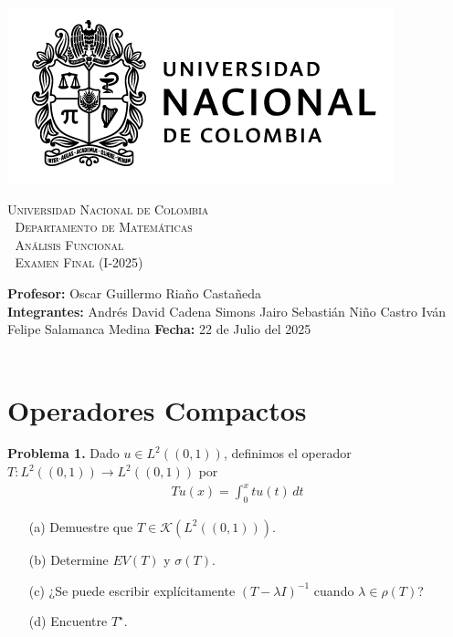 \thispagestyle{empty}

\begin{minipage}{0.3\textwidth}
  \includegraphics[scale=0.35]{logounal.png}
\end{minipage}%
\hfill
\begin{minipage}{0.65\textwidth}
  \begin{center}
    \scshape
    \Large \textsc{Universidad Nacional de Colombia} \\
    \textcolor{white}{\tiny.} \Large \textsc{Departamento de Matemáticas} \\
    \textcolor{white}{\tiny.} \large \textsc{Análisis Funcional} \\
    \textcolor{white}{\tiny.} \large \textsf{Examen Final} \normalsize (I-2025)
  \end{center}
\end{minipage}

\vspace{0.3cm}
\normalfont

\textbf{Profesor:} Oscar Guillermo Riaño Castañeda\\
\textbf{Integrantes:} Andrés David Cadena Simons \hspace{2.8cm}  Jairo Sebastián Niño Castro\hspace{2.8cm}
Iván Felipe Salamanca Medina \hspace{5.05cm}\textbf{Fecha:} 22 de Julio del 2025\\
\vspace{0.25cm}\\


\section{Operadores Compactos}

\textbf{Problema 1.} Dado $u \in L^2((0,1))$, definimos el operador $T:L^2((0,1))\to L^2((0,1))$ por
\begin{align*}
    Tu(x)=\int_0^x tu(t)\, dt
\end{align*}
\begin{enumerate}
        \item[(a)] Demuestre que $T\in \mathcal{K}(L^2((0,1)))$.
        \item[(b)] Determine $EV(T)$ y $\sigma(T)$.
        \item[(c)] ¿Se puede escribir explícitamente $(T-\lambda I)^{-1}$ cuando $\lambda\in \rho(T)$?
        \item[(d)] Encuentre $T^\star$.
\end{enumerate}


